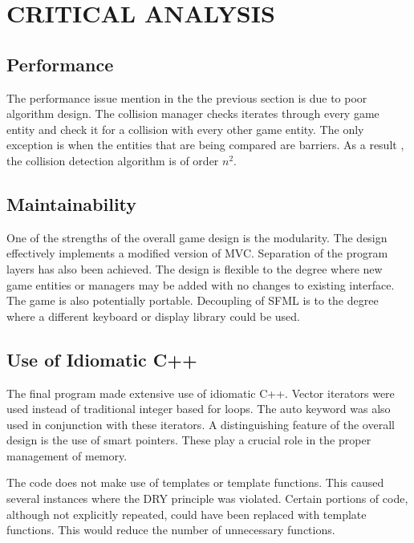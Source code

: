 \documentclass[10pt,twocolumn]{witseiepaper}
\begin{document}

%
\section{CRITICAL ANALYSIS} %

\subsection{Performance}
The performance issue mention in the the previous section is due to poor algorithm design. The collision manager checks iterates through every game entity and check it for a collision with every other game entity. The only exception is when the entities that are being compared are barriers. As a result , the collision detection algorithm is of order $ n^{2} $.


\subsection{Maintainability}
One of the strengths of the overall game design is the modularity. The design effectively implements a modified version of MVC. Separation of the program layers has also been achieved. The design is flexible to the degree where new game entities or managers may be added with no changes to existing interface. The game is also potentially portable. Decoupling of SFML is to the degree where a different keyboard or display library could be used. 

\subsection{Use of Idiomatic C++}
The final program made extensive use of idiomatic C++. Vector iterators were used instead of traditional integer based for loops. The auto keyword was also used in conjunction with these iterators. A distinguishing feature of the overall design is the use of smart pointers. These play a crucial role in the proper management of memory.

The code does not make use of templates or template functions. This caused several instances where the DRY principle was violated. Certain portions of code, although not explicitly repeated, could have been replaced with template functions. This would reduce the number of unnecessary functions.
\end{document}
